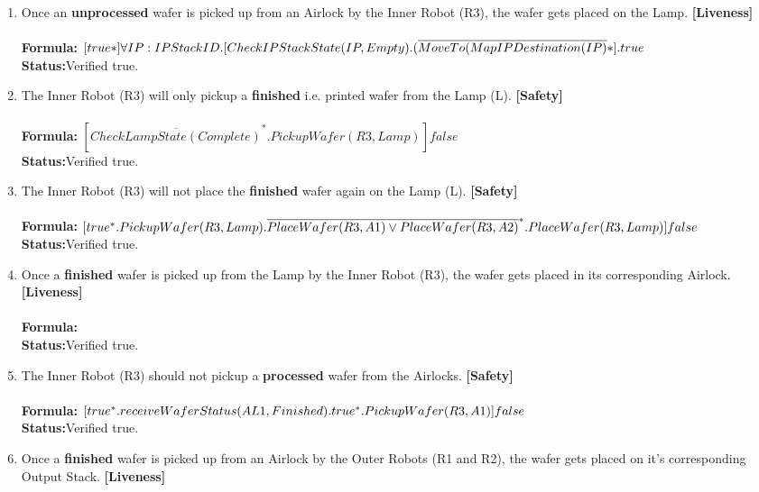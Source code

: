 \documentclass[a4paper,12pt]{article}
\begin{document}
\begin{enumerate}
\item Once an \textbf{unprocessed} wafer is picked up from an Airlock by the Inner Robot (R3), the wafer gets placed on the Lamp. \textbf{[Liveness]}
\\
\\\textbf{Formula:} $[true*] \forall IP: IPStackID.[CheckIPStackState(IP, Empty).
\\(\overline{MoveTo(MapIPDestination(IP)}*].true$ \\\textbf{Status:}Verified true.
\item The Inner Robot (R3) will only pickup a \textbf{finished} i.e. printed wafer from the Lamp (L). \textbf{[Safety]}
\\
\\\textbf{Formula:} $[ \overline{CheckLampState(Complete)}^*.PickupWafer(R3,Lamp)]  false$ 
\\\textbf{Status:}Verified true.
\item The Inner Robot (R3) will not place the \textbf{finished} wafer again on the Lamp (L). \textbf{[Safety]}
\\
\\\textbf{Formula:} $[true^*.PickupWafer(R3,Lamp).
\\ \overline{PlaceWafer(R3,A1) \vee PlaceWafer(R3,A2)}^*.PlaceWafer(R3,Lamp)] false$ \\\textbf{Status:}Verified true.
\item Once a \textbf{finished} wafer is picked up from the Lamp by the Inner Robot (R3), the wafer gets placed in its corresponding Airlock. \textbf{[Liveness]}
\\
\\\textbf{Formula:} 
\\\textbf{Status:}Verified true.
%
\item The Inner Robot (R3) should not pickup a \textbf{processed} wafer from the Airlocks. \textbf{[Safety]}
\\
\\\textbf{Formula:} $[true^*. receiveWaferStatus(AL1, Finished). true^*. 
\\PickupWafer(R3, A1)] false $
\\\textbf{Status:}Verified true.
\item Once a \textbf{finished} wafer is picked up from an Airlock by the Outer Robots (R1 and R2), the wafer gets placed on it's corresponding Output Stack. \textbf{[Liveness]}

\end{enumerate}
\end{document}
